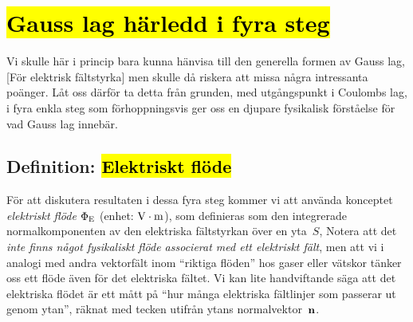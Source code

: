 {\section{\hl{Gauss lag h{\"a}rledd i fyra steg}}
Vi skulle h{\"a}r i princip bara kunna h{\"a}nvisa till den generella formen
av Gauss
lag, [F{\"o}r elektrisk f{\"a}ltstyrka] men skulle d{\aa}
riskera att missa n{\aa}gra intressanta po{\"a}nger.
L{\aa}t oss d{\"a}rf{\"o}r ta detta fr{\aa}n grunden, med ut\-g{\aa}ngs\-punkt
i Coulombs lag, i fyra enkla steg som f{\"o}rhoppningsvis ger oss en djupare
fysikalisk f{\"o}rst{\aa}else f{\"o}r vad Gauss lag inneb{\"a}r.

\subsection{Definition: \hl{Elektriskt fl{\"o}de}}
F{\"o}r att diskutera resultaten i dessa fyra steg kommer vi att anv{\"a}nda
konceptet {\it elektriskt fl{\"o}de} $\Phi_{\rm E}$
(enhet: ${\rm V}\cdot{\rm m}$), som definieras som den integrerade
normalkomponenten av den elektriska f{\"a}ltstyrkan {\"o}ver en yta~$S$,
\noindent
Notera att det {\it inte finns n{\aa}got fysikaliskt fl{\"o}de associerat med
ett elektriskt f{\"a}lt}, men att vi i analogi med andra vektorf{\"a}lt inom
``riktiga fl{\"o}den'' hos gaser eller v{\"a}tskor t{\"a}nker oss ett fl{\"o}de
{\"a}ven f{\"o}r det elektriska f{\"a}ltet.
Vi kan lite handviftande s{\"a}ga att det elektriska fl{\"o}det {\"a}r ett
m{\aa}tt p{\aa} ``hur m{\aa}nga elektriska f{\"a}ltlinjer som passerar ut
genom ytan'', r{\"a}knat med tecken utifr{\aa}n ytans
normalvektor~${\bf n}$.
\vfill\eject

}
